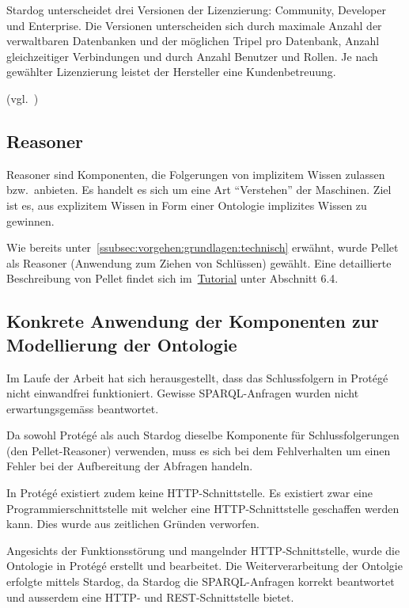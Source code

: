 Stardog unterscheidet drei Versionen der Lizenzierung: Community, Developer und Enterprise. Die Versionen unterscheiden sich durch maximale Anzahl der verwaltbaren Datenbanken und der möglichen Tripel pro Datenbank, Anzahl gleichzeitiger Verbindungen und durch Anzahl Benutzer und Rollen. Je nach gewählter Lizenzierung leistet der Hersteller eine Kundenbetreuung.

(vgl.~\cite{stardogDocu})

\subsection{Reasoner}
\label{subsec:komponenten_reasoner}
Reasoner sind Komponenten,  die Folgerungen von implizitem Wissen zulassen bzw.\ anbieten. Es handelt es sich um eine Art ``Verstehen'' der Maschinen. Ziel ist es, aus explizitem Wissen in Form einer Ontologie implizites Wissen zu gewinnen.

Wie bereits unter~\autoref{ssubsec:vorgehen:grundlagen:technisch} erwähnt, wurde Pellet als Reasoner (Anwendung zum Ziehen von Schlüssen) gewählt. Eine detaillierte Beschreibung von Pellet findet sich im~\hyperref[sec:anhang:tutorial_dokument]{Tutorial} unter Abschnitt 6.4.

\subsection{Konkrete Anwendung der Komponenten zur Modellierung der Ontologie}
\label{subsec:komponenten_anwendung}
Im Laufe der Arbeit hat sich herausgestellt, dass das Schlussfolgern in Protégé nicht einwandfrei funktioniert. Gewisse SPARQL-Anfragen wurden nicht erwartungsgemäss beantwortet.

Da sowohl Protégé als auch Stardog dieselbe Komponente für Schlussfolgerungen (den Pellet-Reasoner) verwenden, muss es sich bei dem Fehlverhalten um einen Fehler bei der Aufbereitung der Abfragen handeln.

In Protégé existiert zudem keine HTTP-Schnittstelle. Es existiert zwar eine Programmierschnittstelle mit welcher eine HTTP-Schnittstelle geschaffen werden kann. Dies wurde aus zeitlichen Gründen verworfen.

Angesichts der Funktionsstörung und mangelnder HTTP-Schnittstelle, wurde die Ontologie in Protégé erstellt und bearbeitet. Die Weiterverarbeitung der Ontolgie erfolgte mittels Stardog, da Stardog die SPARQL-Anfragen korrekt beantwortet und ausserdem eine HTTP- und REST-Schnittstelle bietet.

